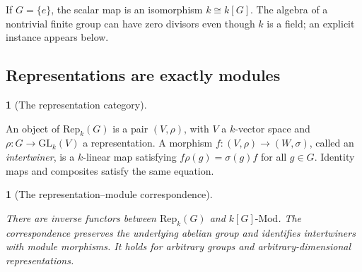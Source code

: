 \documentclass[11pt,a4paper]{article}
\newcommand{\mathheading}{}
\theoremstyle{plain}
\newtheorem*{plainstatement}{\mathheading}
\theoremstyle{definition}
\newtheorem*{definitionstatement}{\mathheading}
\newenvironment{mathstatement}[3]{\renewcommand{\mathheading}{#1 #2}\begin{plainstatement}[#3]}{\end{plainstatement}}
\newenvironment{mathdefinition}[3]{\renewcommand{\mathheading}{#1 #2}\begin{definitionstatement}[#3]}{\end{definitionstatement}}
\begin{document}
If \(G=\{e\}\), the scalar map is an isomorphism \(k\cong k[G]\). The algebra of a nontrivial finite group can have zero divisors even though \(k\) is a field; an explicit instance appears below.

 
\subsection{Representations are exactly modules}
\label{representations}
 
\begin{mathdefinition}{Definition}{7.3}{The representation category}
\label{env-7-3}

An object of \(\mathrm{Rep}_k(G)\) is a pair \((V,\rho)\), with \(V\) a \(k\)-vector space and \(\rho:G\to\mathrm{GL}_k(V)\) a representation. A morphism \(f:(V,\rho)\to(W,\sigma)\), called an \emph{intertwiner}, is a \(k\)-linear map satisfying \(f\rho(g)=\sigma(g)f\) for all \(g\in G\). Identity maps and composites satisfy the same equation.


\par{}\par

\end{mathdefinition}
 
\begin{mathstatement}{Theorem}{7.4}{The representation--module correspondence}
\label{env-7-4}

There are inverse functors between \(\mathrm{Rep}_k(G)\) and \(k[G]\text{-}\mathrm{Mod}\). The correspondence preserves the underlying abelian group and identifies intertwiners with module morphisms. It holds for arbitrary groups and arbitrary-dimensional representations.


\par{}\par

\end{mathstatement}
 
\end{document}
